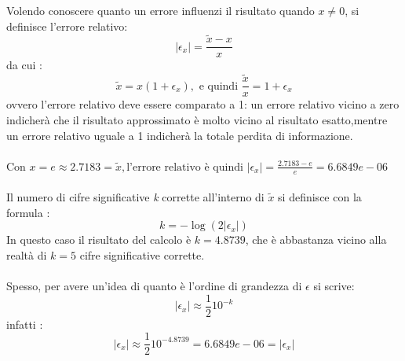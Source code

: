 Volendo conoscere quanto un errore influenzi il risultato quando $x\neq0$, si definisce l’errore relativo:
	\[
	|\epsilon_x| = \frac{\tilde{x}-x}{x} 
	\]
da cui :
	\[
	\tilde{x} = x(1+\epsilon_x), \text{ e quindi } \frac{\tilde{x}}{x} = 1 + \epsilon_x
	\]
ovvero l’errore relativo deve essere comparato a 1: un errore relativo vicino a zero indicherà che il risultato approssimato è molto vicino al risultato esatto,mentre un errore relativo uguale a 1 indicherà la totale perdita di informazione.\\\\
Con $x = e \approx 2.7183 = \tilde{x}, \text{l'errore relativo è quindi } |\epsilon_x| = \frac{2.7183 - e}{e} = 6.6849e-06$\\\\
Il numero di cifre significative \textit{k} corrette all’interno di $\tilde{x}$ si definisce con la formula :
	\[
	\textit{k} = -\log(2|\epsilon_x|)
	\]
In questo caso il risultato del calcolo è $\textit{k}=4.8739$, che è abbastanza vicino alla realtà di $\textit{k}=5$ cifre significative corrette.\\\\
Spesso, per avere un’idea di quanto è l’ordine di grandezza di $\epsilon$ si scrive:
	\[
	|\epsilon_x| \approx \frac{1}{2}10^{-\textit{k}}
	\]
infatti : 
	\[
	|\epsilon_x| \approx \frac{1}{2}10^{-4.8739} = 6.6849e-06 = |\epsilon_x|
	\]